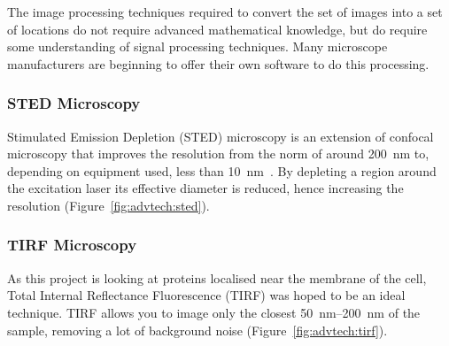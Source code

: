 \documentclass[../main.tex]{subfiles}
\begin{document}
The image processing techniques required to convert the set of images into a set of locations do not require advanced mathematical knowledge, but do require some understanding of signal processing techniques. Many microscope manufacturers are beginning to offer their own software to do this processing.

\subsubsection{STED Microscopy}

Stimulated Emission Depletion (STED) microscopy is an extension of confocal microscopy that improves the resolution from the norm of around \SI{200}{\nano\meter} to, depending on equipment used, less than \SI{10}{\nano\meter}~\citep{rittweger09}. By depleting a region around the excitation laser its effective diameter is reduced, hence increasing the resolution (Figure~\ref{fig:advtech:sted}).

\subsubsection{TIRF Microscopy}

As this project is looking at proteins localised near the membrane of the cell, Total Internal Reflectance Fluorescence (TIRF) was hoped to be an ideal technique. TIRF allows you to image only the closest \SIrange{50}{200}{\nano\meter} of the sample, removing a lot of background noise (Figure~\ref{fig:advtech:tirf}).
\end{document}
